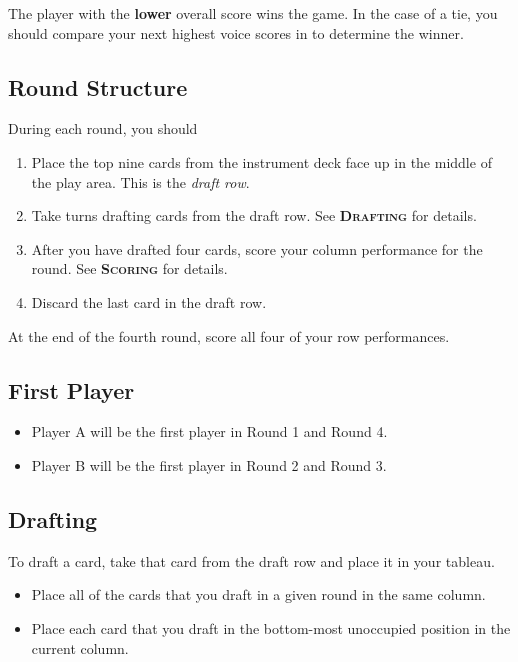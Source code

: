 \documentclass[a6paper, 12pt, parskip=half, DIV=14]{scrartcl}
\begin{document}
The player with the \textbf{lower} overall score wins the game. In the case of a tie, you should compare your next highest voice scores in to determine the winner. 

\newpage
\enlargethispage{1.75\baselineskip}
\subsection*{Round Structure}
During each round, you should
\begin{enumerate}[leftmargin=4ex]
\item Place the top nine cards from the instrument deck face up in the middle of the play area. This is the \emph{draft row}.

\item Take turns drafting cards from the draft row. See \textcolor{redfabric}{\textbf{\scshape{Drafting}}} for details.

\item After you have drafted four cards, score your column performance for the round. See \textcolor{redfabric}{\textbf{\scshape{Scoring}}} for details.

\item Discard the last card in the draft row.
\end{enumerate}

At the end of the fourth round, score all four of your row performances.

\subsection*{First Player}
\begin{itemize}[leftmargin=4ex]
\item Player A will be the first player in Round 1 and Round 4.
\item Player B will be the first player in Round 2 and Round 3.
\end{itemize}

\newpage
\enlargethispage{1.75\baselineskip}
\subsection*{Drafting}
To draft a card, take that card from the draft row and place it in your tableau.
\begin{itemize}[leftmargin=4ex]
\item Place all of the cards that you draft in a given round in the same column.
\item Place each card that you draft in the bottom-most unoccupied position in the current column.
\end{itemize}
\end{document}
